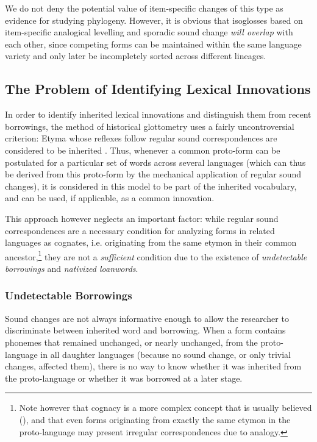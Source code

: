 \documentclass[svgnames,12pt]{scrartcl}
\begin{document}
{{We do not deny the potential value of item-specific changes of this type as evidence for studying phylogeny. However, it is obvious that isoglosses based on item-specific analogical levelling and sporadic sound change \emph{will overlap} with each other, since competing forms can be maintained within the same language variety and only later be incompletely sorted across different lineages.


\subsection{The Problem of Identifying Lexical Innovations} \label{sec:ILS}
In order to identify inherited lexical innovations and distinguish them from recent borrowings, the
method of historical glottometry uses a fairly uncontroversial criterion: Etyma whose reflexes
follow regular sound correspondences are considered to be inherited \citep[176-8]{Francois2014}.
Thus, whenever a common proto-form can be postulated for a particular set of words across several languages (which can thus be derived from this proto-form by the mechanical application of regular sound changes), it is considered in this model to be part of the inherited vocabulary, and can be
used, if applicable, as a common innovation.

This approach however neglects an important factor: while regular sound correspondences are a
necessary condition for analyzing forms in related languages as cognates, i.e. originating from the
same etymon in their common ancestor,\footnote{Note however that cognacy is a more complex concept
that is usually believed (\citealt{list16cognacy}), and that even forms originating from exactly
the same etymon in the proto-language may present irregular correspondences due to analogy.} they
are not a \textit{sufficient} condition due to the existence of \textit{undetectable borrowings} and
\textit{nativized loanwords}.  
 

\subsubsection{Undetectable Borrowings}
Sound changes are not always informative enough to allow the researcher to discriminate between inherited word and borrowing. When a form contains phonemes that remained unchanged, or nearly unchanged, from the proto-language in all daughter languages (because no sound change, or only trivial changes, affected them), there is no way to know whether it was inherited from the proto-language or whether it was borrowed at a later stage. 

}}
\end{document}
